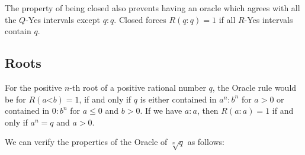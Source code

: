 \documentclass[12pt]{article}
\theoremstyle{remark}
\newcommand{\lt}{\mathord{<}}
\begin{document}
The property of being closed also prevents having an oracle which agrees with all the $Q$-Yes intervals except $q:q$. Closed forces $R(q:q)=1$ if all $R$-Yes intervals contain $q$.

\subsection{Roots}

For the positive $n$-th root of a positive rational number $q$, the Oracle rule would be for $R(a\lt b) = 1$, if and only if $q$ is either contained in $a^n:b^n$ for $a>0$ or contained in $0:b^n$ for $a \leq 0$ and $b>0$. If we have $a:a$, then $R(a:a) = 1$ if and only if $a^n = q$ and $a>0$.

We can verify the properties of the Oracle of $\sqrt[n]{q}$ as follows: 
\end{document}
